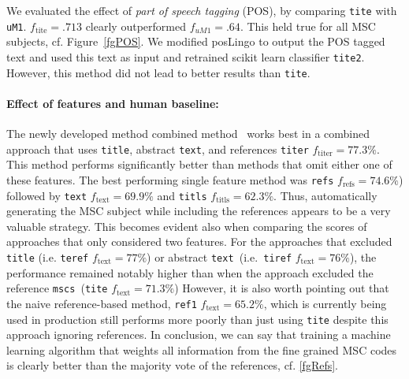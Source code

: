 We evaluated the effect of \emph{part of speech tagging} (POS), by comparing \texttt{tite} with \texttt{uM1}. \(f_{\mathrm{tite}} = .713\) clearly outperformed \(f_{uM1} = .64.\)
This held true for all MSC subjects, cf. Figure~\ref{fgPOS}.
We modified posLingo to output the POS tagged text and used this text as input and retrained scikit learn classifier \texttt{tite2}.
However, this method did not lead to better results than \texttt{tite}.

\paragraph{Effect of features and human baseline:}
The newly developed method combined method~\cite{Scharpf2020} works best in a combined approach that uses \texttt{title}, abstract \texttt{text}, and references \texttt{titer} \(f_{\mathrm{titer}} = 77.3\%.\)
This method performs significantly better than methods that omit either one of these features.
The best performing single feature method was \texttt{refs} \(f_{\mathrm{refs}} = 74.6\%\)) followed by \texttt{text} \(f_{\mathrm{text}} = 69.9\%\) and \texttt{titls} \(f_{\mathrm{titls}} = 62.3\%\).
Thus, automatically generating the MSC subject while including the references appears to be a very valuable strategy.
This becomes evident also when comparing the scores of approaches that only considered two features. For the approaches that excluded \texttt{title} (i.e. \texttt{teref} \(f_{\mathrm{text}} = 77\%\)) or abstract \texttt{text}\texttt{\ }(i.e.\texttt{\ }\texttt{tiref} \(f_{\mathrm{text}} = 76\%\)), the performance remained notably higher than when the approach excluded the reference \texttt{mscs}\ (\texttt{tite} \(f_{\mathrm{text}} = 71.3\%\))
However, it is also worth pointing out that the naive reference-based method, \texttt{ref1} \(f_{\mathrm{text}} = 65.2\%\), which is currently being used in production still performs more poorly than just using \texttt{tite} despite this approach ignoring references.
In conclusion, we can say that training a machine learning algorithm that weights all information from the fine grained MSC codes is clearly better than the majority vote of the references, cf. \ref{fgRefs}.



